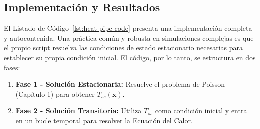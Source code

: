 \subsection{Implementación y Resultados}
El Listado de Código~\ref{lst:heat-pipe-code} presenta una implementación completa y autocontenida. Una práctica común y robusta en simulaciones complejas es que el propio script resuelva las condiciones de estado estacionario necesarias para establecer su propia condición inicial. El código, por lo tanto, se estructura en dos fases:
\begin{enumerate}
    \item \textbf{Fase 1 - Solución Estacionaria:} Resuelve el problema de Poisson (Capítulo 1) para obtener \(T_{ss}(\bm{x})\).
    \item \textbf{Fase 2 - Solución Transitoria:} Utiliza \(T_{ss}\) como condición inicial y entra en un bucle temporal para resolver la Ecuación del Calor.
\end{enumerate}

